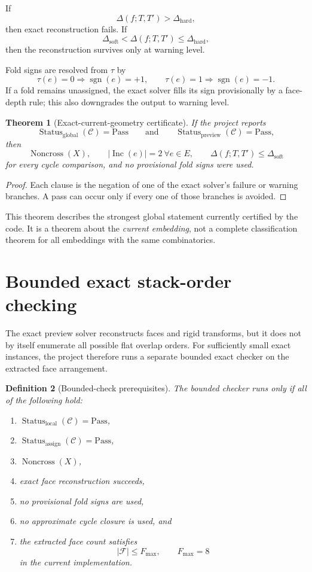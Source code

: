 \documentclass[11pt]{article}
\newtheorem{definition}{Definition}[section]
\newtheorem{theorem}[definition]{Theorem}
\theoremstyle{remark}
\newcommand{\CP}{\mathcal{C}}
\newcommand{\abs}[1]{\left\lvert #1 \right\rvert}
\newcommand{\Pass}{\mathrm{Pass}}
\begin{document}
If
\[
\Delta(f;T,T') > \Delta_{\mathrm{hard}},
\]
then exact reconstruction fails. If
\[
\Delta_{\mathrm{soft}} < \Delta(f;T,T') \le \Delta_{\mathrm{hard}},
\]
then the reconstruction survives only at warning level.

Fold signs are resolved from $\tau$ by
\[
\tau(e)=0 \Longrightarrow \operatorname{sgn}(e)=+1,
\qquad
\tau(e)=1 \Longrightarrow \operatorname{sgn}(e)=-1.
\]
If a fold remains unassigned, the exact solver fills its sign provisionally by a
face-depth rule; this also downgrades the output to warning level.

\begin{theorem}[Exact-current-geometry certificate]
If the project reports
\[
\operatorname{Status}_{\mathrm{global}}(\CP)=\Pass
\qquad\text{and}\qquad
\operatorname{Status}_{\mathrm{preview}}(\CP)=\Pass,
\]
then
\[
\operatorname{Noncross}(X),
\qquad
\abs{\operatorname{Inc}(e)}=2 \ \forall e\in E,
\qquad
\Delta(f;T,T')\le \Delta_{\mathrm{soft}}
\]
for every cycle comparison, and no provisional fold signs were used.
\end{theorem}

\begin{proof}
Each clause is the negation of one of the exact solver's failure or warning
branches. A pass can occur only if every one of those branches is avoided.
\end{proof}

This theorem describes the strongest global statement currently certified by the
code. It is a theorem about the \emph{current embedding}, not a complete
classification theorem for all embeddings with the same combinatorics.

\section{Bounded exact stack-order checking}

The exact preview solver reconstructs faces and rigid transforms, but it does
not by itself enumerate all possible flat overlap orders. For sufficiently
small exact instances, the project therefore runs a separate bounded exact
checker on the extracted face arrangement.

\begin{definition}[Bounded-check prerequisites]
The bounded checker runs only if all of the following hold:
\begin{enumerate}
    \item $\operatorname{Status}_{\mathrm{local}}(\CP)=\Pass$,
    \item $\operatorname{Status}_{\mathrm{assign}}(\CP)=\Pass$,
    \item $\operatorname{Noncross}(X)$,
    \item exact face reconstruction succeeds,
    \item no provisional fold signs are used,
    \item no approximate cycle closure is used, and
    \item the extracted face count satisfies
    \[
    \abs{\mathcal F}\le F_{\max},
    \qquad
    F_{\max}=8
    \]
    in the current implementation.
\end{enumerate}
\end{definition}
\end{document}
